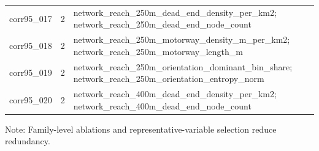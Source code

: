 \begin{table}[htbp]
{\begin{tabular}{rrl}
corr95\_017 & 2 & network\_reach\_250m\_dead\_end\_density\_per\_km2; network\_reach\_250m\_dead\_end\_node\_count \\
corr95\_018 & 2 & network\_reach\_250m\_motorway\_density\_m\_per\_km2; network\_reach\_250m\_motorway\_length\_m \\
corr95\_019 & 2 & network\_reach\_250m\_orientation\_dominant\_bin\_share; network\_reach\_250m\_orientation\_entropy\_norm \\
corr95\_020 & 2 & network\_reach\_400m\_dead\_end\_density\_per\_km2; network\_reach\_400m\_dead\_end\_node\_count \\
\bottomrule
\end{tabular}%
}
\begin{minipage}{0.96\textwidth}\vspace{2pt}\scriptsize Note: Family-level ablations and representative-variable selection reduce redundancy.\end{minipage}
\end{table}

